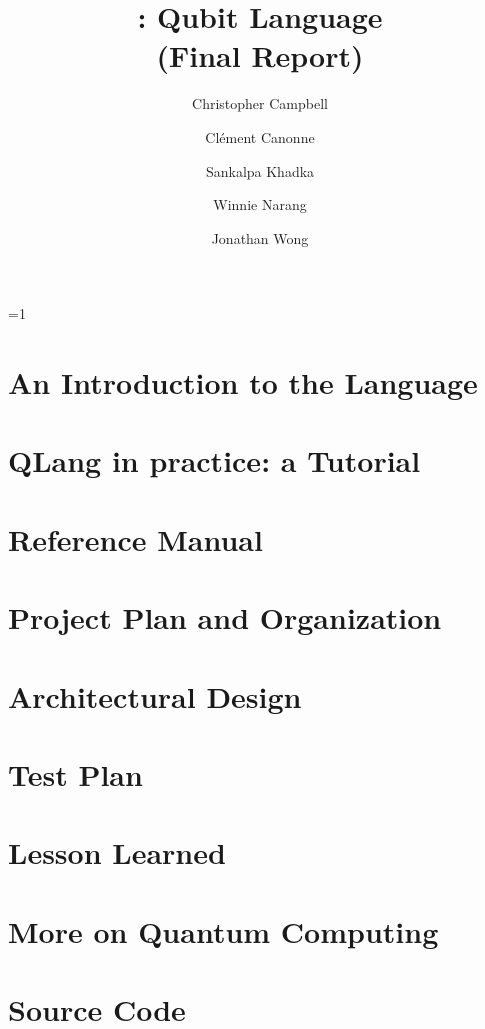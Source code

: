 \documentclass[11pt]{report}
\title{\QL: Qubit Language\\ \Large(Final Report)}
\author{
  Christopher Campbell
  \and Cl\'ement Canonne
  \and Sankalpa Khadka
  \and Winnie Narang
  \and Jonathan Wong
}
\def\withnotes{0}
\newcommand{\QL}{\textsf{QLang}\xspace}
\begin{document}
\maketitle
\tableofcontents

\ifnum\withnotes=1
  \listoftodos
\fi

\chapter{An Introduction to the Language}
  
\chapter{\QL in practice: a Tutorial}
  
\chapter{Reference Manual}\label{sec:reference}
  
\chapter{Project Plan and Organization}

\chapter{Architectural Design}

\chapter{Test Plan}
  
\chapter{Lesson Learned}
  
\appendix
\chapter{More on Quantum Computing}\label{app:quantum:more}
  
\chapter{Source Code}

\end{document}
